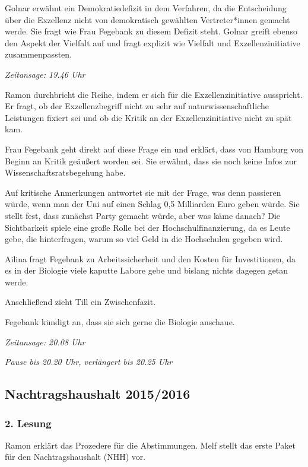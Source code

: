 \documentclass[ngerman,headheight=70pt]{scrartcl}
\begin{document}
    Golnar erwähnt ein Demokratiedefizit in dem Verfahren, da die Entscheidung
    über die Exzellenz nicht von demokratisch gewählten Vertreter*innen gemacht
    werde. Sie fragt wie Frau Fegebank zu diesem Defizit steht. Golnar greift
    ebenso den Aspekt der Vielfalt auf und fragt explizit wie Vielfalt und
    Exzellenzinitiative zusammenpassten.

    \textit{Zeitansage: 19.46 Uhr}

    Ramon durchbricht die Reihe, indem er sich für die Exzellenzinitiative
    ausspricht. Er fragt, ob der Exzellenzbegriff nicht zu sehr auf
    naturwissenschaftliche Leistungen fixiert sei und ob die Kritik an der
    Exzellenzinitiative nicht zu spät kam.

    Frau Fegebank geht direkt auf diese Frage ein und erklärt, dass von Hamburg
    von Beginn an Kritik geäußert worden sei. Sie erwähnt, dass sie noch keine
    Infos zur Wissenschaftsratsbegehung habe.

    Auf kritische Anmerkungen antwortet sie mit der Frage, was denn passieren würde,
    wenn man der Uni auf einen Schlag 0,5 Milliarden Euro geben würde. Sie stellt
    fest, dass zunächst Party gemacht würde, aber was käme danach? Die Sichtbarkeit
    spiele eine große Rolle bei der Hochschulfinanzierung, da es Leute gebe, die
    hinterfragen, warum so viel Geld in die Hochschulen gegeben wird.

    Ailina fragt Fegebank zu Arbeitssicherheit und den Kosten für Investitionen,
    da es in der Biologie viele kaputte Labore gebe und bislang nichts dagegen
    getan werde.

    Anschließend zieht Till ein Zwischenfazit.

    Fegebank kündigt an, dass sie sich gerne die Biologie anschaue.

    \textit{Zeitansage: 20.08 Uhr}

    \textit{Pause bis 20.20 Uhr, verlängert bis 20.25 Uhr}

    \subsection{Nachtragshaushalt 2015/2016}
    \subsubsection{2. Lesung}

    Ramon erklärt das Prozedere für die Abstimmungen. Melf stellt das erste
    Paket für den Nachtragshaushalt (NHH) vor.
\end{document}
